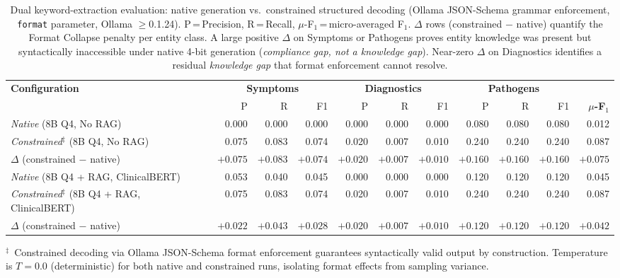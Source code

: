 \begin{table}[t]
\centering
\caption{%
  Dual keyword-extraction evaluation: native generation vs.\ constrained
  structured decoding (Ollama JSON-Schema grammar enforcement,
  \texttt{format} parameter, Ollama $\geq$0.1.24).
  P\,=\,Precision, R\,=\,Recall, $\mu$-F$_1$\,=\,micro-averaged F$_1$.
  $\Delta$ rows (constrained $-$ native) quantify the Format Collapse
  penalty per entity class. A large positive $\Delta$ on Symptoms or
  Pathogens proves entity knowledge was present but syntactically
  inaccessible under native 4-bit generation
  (\emph{compliance gap, not a knowledge gap}).
  Near-zero $\Delta$ on Diagnostics identifies a residual
  \emph{knowledge gap} that format enforcement cannot resolve.
}
\label{tab:keywords_constrained}
\setlength{\tabcolsep}{3pt}
\begin{tabular}{@{}lrrrrrrrrrr@{}}
\toprule
\textbf{Configuration} & \multicolumn{3}{c}{\textbf{Symptoms}} & \multicolumn{3}{c}{\textbf{Diagnostics}} & \multicolumn{3}{c}{\textbf{Pathogens}} & \\
 & P & R & F1 & P & R & F1 & P & R & F1 & \textbf{$\mu$-F$_1$} \\
\midrule
\textit{Native} (8B Q4, No RAG) & 0.000 & 0.000 & 0.000 & 0.000 & 0.000 & 0.000 & 0.080 & 0.080 & 0.080 & 0.012 \\
\textit{Constrained}$^\ddagger$ (8B Q4, No RAG) & 0.075 & 0.083 & 0.074 & 0.020 & 0.007 & 0.010 & 0.240 & 0.240 & 0.240 & 0.087 \\
\midrule
$\Delta$ (constrained $-$ native) & $+0.075$ & $+0.083$ & $+0.074$ & $+0.020$ & $+0.007$ & $+0.010$ & $+0.160$ & $+0.160$ & $+0.160$ & $+0.075$ \\
\midrule
\textit{Native} (8B Q4 + RAG, ClinicalBERT) & 0.053 & 0.040 & 0.045 & 0.000 & 0.000 & 0.000 & 0.120 & 0.120 & 0.120 & 0.045 \\
\textit{Constrained}$^\ddagger$ (8B Q4 + RAG, ClinicalBERT) & 0.075 & 0.083 & 0.074 & 0.020 & 0.007 & 0.010 & 0.240 & 0.240 & 0.240 & 0.087 \\
\midrule
$\Delta$ (constrained $-$ native) & $+0.022$ & $+0.043$ & $+0.028$ & $+0.020$ & $+0.007$ & $+0.010$ & $+0.120$ & $+0.120$ & $+0.120$ & $+0.042$ \\
\bottomrule
\end{tabular}
\vspace{4pt}
\begin{minipage}{\linewidth}
\footnotesize
$^\ddagger$~Constrained decoding via Ollama JSON-Schema format
enforcement guarantees syntactically valid output by construction.
Temperature is $T=0.0$ (deterministic) for both native and constrained
runs, isolating format effects from sampling variance.
\end{minipage}
\end{table}

